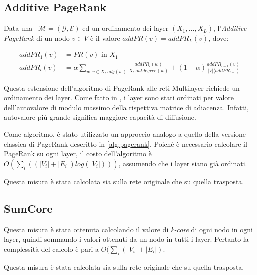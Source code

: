 \subsection{Additive PageRank}
\begin{definizione}
    Data una \muln\ $\mathcal{M}=(\mathcal{G}, \mathcal{E})$ 
    ed un ordinamento dei layer $(X_1, \dots, X_{L})$, l'\textit{Additive PageRank}
    di un nodo $v \in V$ è il valore 
    $addPR(v) = addPR_L(v)$, dove:

    \begin{equation}
        \begin{split}
addPR_1(v)&= PR(v) \text{ in } X_1 \\
addPR_l(v)&= \alpha \sum_{w : v \in X_l.adj(w)} 
            \frac{addPR_l(w)}{X_l.outdegree(w)} + 
            (1-\alpha)\frac{addPR_{l-1}(v)}{|V| \langle addPR_{l-1} \rangle}
        \end{split}
    \end{equation}

\end{definizione}

Questa estensione dell'algoritmo di PageRank alle reti Multilayer richiede un ordinamento
dei layer. Come fatto in \cite{basaras:infspmul}, i layer sono stati ordinati per valore
dell'autovalore di modulo massimo della rispettiva matrice di adiacenza. Infatti, 
autovalore più grande significa maggiore capacità di diffusione\cite{wang:eigenv}.

Come algoritmo, è stato utilizzato un approccio analogo a quello della versione classica di 
PageRank descritto in \vref{alg:pagerank}.
Poichè è necessario calcolare il PageRank su ogni layer, il costo dell'algoritmo è 
$O(\sum_{i}((|V_i| + |E_i|)log(|V_i|)))$, assumendo che i layer siano già ordinati.

Questa misura è stata calcolata sia sulla rete originale che su quella trasposta.

\subsection{SumCore}
Questa misura è stata ottenuta calcolando il valore di \textit{k-core} di ogni nodo in 
ogni layer, quindi sommando i valori ottenuti da un nodo in tutti i layer.
Pertanto la complessità del calcolo è pari a $O(\sum_{i}(|V_i| + |E_i|)$.

Questa misura è stata calcolata sia sulla rete originale che su quella trasposta.

